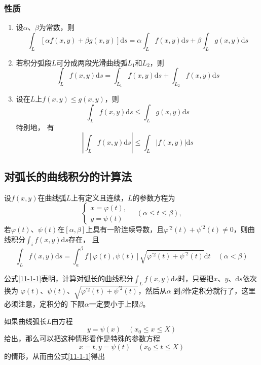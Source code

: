 \documentclass[12pt, a4paper]{article}
\numberwithin{equation}{section}
\newcommand{\rmd}{\mathrm{d}}
\begin{document}
\subsubsection{性质}

    \begin{enumerate}
        \item 设\(\alpha\)、\(\beta\)为常数，则\[\int_L\left[\alpha f(x, y)+\beta g(x, y)\right] \mathrm{d} s=\alpha \int_L f(x, y) \mathrm{d} s+\beta \int_L g(x, y) \mathrm{d} s\]
        \item 若积分弧段$L$可分成两段光滑曲线弧$L_1$和$L_2$，则\[\int_L f(x, y) \mathrm{d} s=\int_{L_1} f(x, y) \mathrm{d} s+\int_{L_2} f(x, y) \mathrm{d} s\]
        \item 设在\(L\)上\(f\left(x,y\right) \leq g\left(x,y\right)\)，则\[\int_L f(x, y) \mathrm{d} s \leq \int_L g(x, y) \mathrm{d} s\]特别地，
            有\[\left| \int_L f(x, y) \mathrm{d} s \right| \leq \int_L \left| f(x, y) \right| \mathrm{d} s\]
    \end{enumerate}


\subsection{对弧长的曲线积分的计算法}

    设$f(x, y)$在曲线弧$L$上有定义且连续，$L$的参数方程为
    \[
        \left\{\begin{array}{l}
        x=\varphi(t), \\
        y=\psi(t)
        \end{array} \quad(\alpha \leq t \leq \beta),\right.
    \]
    若$\varphi(t)$、$\psi(t)$在$[\alpha, \beta]$上具有一阶连续导数，且$\varphi^{\prime 2}(t)+\psi^{\prime 2}(t) \neq 0$，则曲线积分$\int_i f(x, y) \mathrm{d} s$存在，
    且\begin{equation}
    \int_L f(x, y) \mathrm{d} s=\int_a^\beta f[\varphi(t), \psi(t)] \sqrt{\varphi^{\prime 2}(t)+\psi^{\prime 2}(t)} \mathrm{d} t \quad(\alpha<\beta)
    \label{11-1-1}
    \end{equation}

    公式\ref{11-1-1}表明，计算对弧长的曲线积分\(\int_L f(x, y) \mathrm{d} s\)时，只要把\(x\)、\(y\)、\(\rmd s\)依次换为
    \(\varphi\left(t\right)\)、\(\psi\left(t\right)\)、\(\sqrt{\varphi^{\prime 2}(t)+\psi^{\prime 2}(t)}\)，然后从\(\alpha\)
    到\(\beta\)作定积分就行了，这里必须注意，定积分的 下限\(\alpha\)一定要小于上限\(\beta\)。

    如果曲线弧长\(L\)由方程\[y=\psi(x) \quad (x_0 \leq x \leq X)\]给出，那么可以把这种情形看作是特殊的参数方程
    \[x=t, y=\psi(t) \quad (x_0 \leq t \leq X)\]的情形，从而由公式\ref{11-1-1}得出
\end{document}
